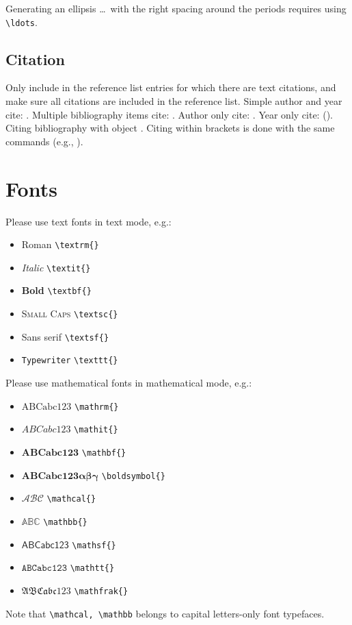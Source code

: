 \documentclass[ecta,nameyear,draft]{econsocart}
\theoremstyle{plain}
\theoremstyle{definition}
\begin{document}
Generating an ellipsis \ldots\ with the right spacing
around the periods requires using \verb|\ldots|.

\subsection{Citation}
Only include in the reference list entries for which there are text citations,
and make sure all citations are included in the reference list.
Simple author and year cite: \citet{b1}. 
Multiple bibliography items cite: \citet{b2,b3,b4,b5}.
Author only cite: \citeauthor{b4}.
Year only cite: (\citeyear{b4}). Citing bibliography with object \citet[Theorem 1]{b1}. Citing within brackets is done with the same commands (e.g., \citet{b2,b3,b4}).

\section{Fonts}
Please use text fonts in text mode, e.g.:
\begin{itemize}
\item[]\textrm{Roman} \verb|\textrm{}|
\item[]\textit{Italic} \verb|\textit{}|
\item[]\textbf{Bold} \verb|\textbf{}|
\item[]\textsc{Small Caps} \verb|\textsc{}|
\item[]\textsf{Sans serif} \verb|\textsf{}|
\item[]\texttt{Typewriter} \verb|\texttt{}|
\end{itemize}
Please use mathematical fonts in mathematical mode, e.g.:
\begin{itemize}
\item[] $\mathrm{ABCabc123}$ \verb|\mathrm{}|
\item[] $\mathit{ABCabc123}$ \verb|\mathit{}|
\item[] $\mathbf{ABCabc123}$ \verb|\mathbf{}|
\item[] $\boldsymbol{ABCabc123\alpha\beta\gamma}$ \verb|\boldsymbol{}|
\item[] $\mathcal{ABC}$ \verb|\mathcal{}|
\item[] $\mathbb{ABC}$ \verb|\mathbb{}|
\item[] $\mathsf{ABCabc123}$ \verb|\mathsf{}| 
\item[] $\mathtt{ABCabc123}$ \verb|\mathtt{}|
\item[] $\mathfrak{ABCabc123}$ \verb|\mathfrak{}|
\end{itemize}
Note that \verb|\mathcal, \mathbb| belongs to capital letters-only font typefaces.
\end{document}
